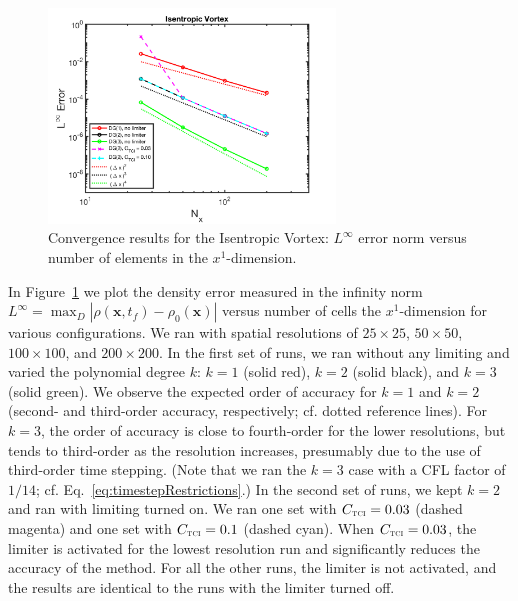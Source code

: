 \documentclass[letterpaper]{jpconf}
\newcommand{\vect}[1]{\boldsymbol{#1}}
\newcommand{\TCI}{\textnormal{\tiny\textsc{TCI}}}
\begin{document}
\begin{figure}
  \includegraphics[width=18pc]{./Figures/IsentropicVortex_Astronum_2018}
  \caption{\label{fig:IsentropicVortex}Convergence results for the Isentropic Vortex:  $L^{\infty}$ error norm versus number of elements in the $x^{1}$-dimension.}
\end{figure}

In Figure~\ref{fig:IsentropicVortex} we plot the density error measured in the infinity norm $L^{\infty}=\max_{D}|\rho(\vect{x},t_{f})-\rho_{0}(\vect{x})|$ versus number of cells the $x^{1}$-dimension for various configurations.  
We ran with spatial resolutions of $25\times25$, $50\times50$, $100\times100$, and $200\times200$.  
In the first set of runs, we ran without any limiting and varied the polynomial degree $k$: $k=1$ (solid red), $k=2$ (solid black), and $k=3$ (solid green).  
We observe the expected order of accuracy for $k=1$ and $k=2$ (second- and third-order accuracy, respectively; cf. dotted reference lines).  
For $k=3$, the order of accuracy is close to fourth-order for the lower resolutions, but tends to third-order as the resolution increases, presumably due to the use of third-order time stepping.  
(Note that we ran the $k=3$ case with a CFL factor of $1/14$; cf. Eq.~\eqref{eq:timestepRestrictions}.)
In the second set of runs, we kept $k=2$ and ran with limiting turned on.  
We ran one set with $C_{\TCI}=0.03$ (dashed magenta) and one set with $C_{\TCI}=0.1$ (dashed cyan).  
When $C_{\TCI}=0.03$, the limiter is activated for the lowest resolution run and significantly reduces the accuracy of the method.  
For all the other runs, the limiter is not activated, and the results are identical to the runs with the limiter turned off.  
\end{document}
